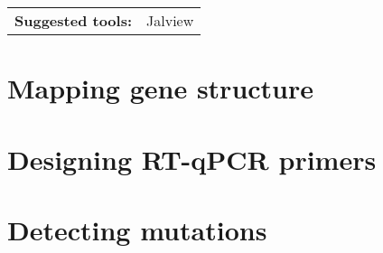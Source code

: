 \documentclass[11pt]{article}
\begin{document}
	\vspace*{\baselineskip}
	
	\noindent\begin{tabular}{@{}ll}
		\textbf{Suggested tools:}	& Jalview \\
	\end{tabular} 
	
	\section{Mapping gene structure\label{sec:str}}
	
	\section{Designing RT-qPCR primers\label{sec:qpcr}}
	
	\section{Detecting mutations\label{sec:mut}}
 	
 	
\end{document}
